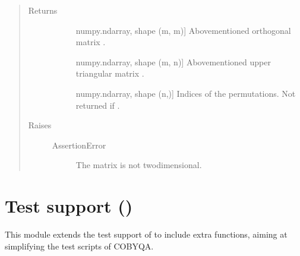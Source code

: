 \documentclass[letterpaper,10pt,english]{sphinxmanual}
\begin{document}
\begin{fulllineitems}
\begin{quote}
\begin{description}
\item[{Returns}] \leavevmode\begin{description}
\item[{}] \leavevmode{[}numpy.ndarray, shape (m, m){]}
\sphinxAtStartPar
Above\sphinxhyphen{}mentioned orthogonal matrix .

\item[{}] \leavevmode{[}numpy.ndarray, shape (m, n){]}
\sphinxAtStartPar
Above\sphinxhyphen{}mentioned upper triangular matrix .

\item[{}] \leavevmode{[}numpy.ndarray, shape (n,){]}
\sphinxAtStartPar
Indices of the permutations. Not returned if .

\end{description}

\item[{Raises}] \leavevmode\begin{description}
\item[{AssertionError}] \leavevmode
\sphinxAtStartPar
The matrix  is not two\sphinxhyphen{}dimensional.

\end{description}

\end{description}\end{quote}

\end{fulllineitems}

\label{\detokenize{refs/tests:module-cobyqa.tests}}

\chapter{Test support ()}
\label{\detokenize{refs/tests:test-support-cobyqa-tests}}\label{\detokenize{refs/tests::doc}}
\sphinxAtStartPar
This module extends the test support of  to include extra
functions, aiming at simplifying the test scripts of COBYQA.
\end{document}
